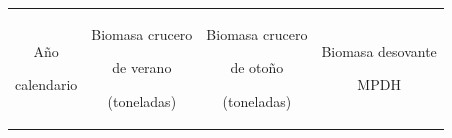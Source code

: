 \documentclass[
  spanish,
]{article}
\begin{document}
\begin{longtable}[]{@{}cccc@{}}
\toprule
\begin{minipage}[b]{0.16\columnwidth}\centering
Año

calendario\strut
\end{minipage} & \begin{minipage}[b]{0.22\columnwidth}\centering
Biomasa crucero

de verano

(toneladas)\strut
\end{minipage} & \begin{minipage}[b]{0.22\columnwidth}\centering
Biomasa crucero

de otoño

(toneladas)\strut
\end{minipage} & \begin{minipage}[b]{0.25\columnwidth}\centering
Biomasa desovante

MPDH


\end{minipage}
\end{longtable}
\end{document}
